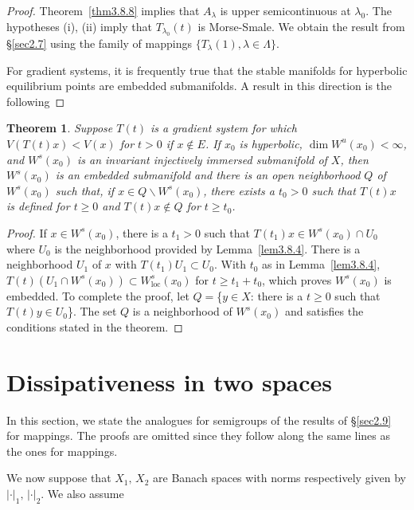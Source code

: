 \documentclass{surv-l}
\theoremstyle{plain}
\newtheorem{theorem}{Theorem}[section]
\theoremstyle{definition}
\numberwithin{equation}{section}
\numberwithin{figure}{chapter}
\begin{document}
\begin{proof} Theorem~\ref{thm3.8.8} implies that $A_{\lambda}$ is upper semicontinuous at $\lambda_{0}$. The hypotheses (i), (ii) imply that $T_{\lambda_{0}}(t)$ is Morse-Smale. We obtain the result from \S\ref{sec2.7} using the family of mappings $\{T_{\lambda}(1), \lambda\in\Lambda\}$.

For gradient systems, it is frequently true that the stable manifolds for hyperbolic equilibrium points are embedded submanifolds. A result in this direction is the following
\end{proof}

\begin{theorem}\label{thm3.8.11} Suppose $T(t)$ is a gradient system for which $V(T(t)x)< V(x)$ for $t>0$ if $x\not\in E$. If $x_{0}$ is hyperbolic, $\dim W^{u}(x_{0})<\infty$, and $W^{s}(x_{0})$ is an invariant injectively immersed submanifold of $X$, then $W^{s}(x_{0})$ is an embedded submanifold and there is an open neighborhood $Q$ of $W^{s}(x_{0})$ such that, if $ x\in Q\backslash W^{s}(x_{0})$, there exists a $t_{0}>0$ such that $T(t)x$ is defined for $t\geq 0$ and $ T(t)x\not\in Q$ for $t\geq t_{0}$.
\end{theorem}

\begin{proof} If $x\in W^{s}(x_{0})$, there is a $t_{1}>0$ such that $T(t_{1})x\in W^{s}(x_{0})\cap U_{0}$ where $U_{0}$ is the neighborhood provided by Lemma~\ref{lem3.8.4}. There is a neighborhood $U_{1}$ of $x$ with $T(t_{1})U_{1}\subset U_{0}$. With $t_{0}$ as in Lemma~\ref{lem3.8.4}, $ T(t)(U_{1}\cap W^{s}(x_{0}))\subset W_{\mathrm{loc}}^{s}(x_{0})$ for $t\geq t_{1}+t_{0}$, which proves $W^{s}(x_{0})$ is embedded. To complete the proof, let $Q=$\{$y\in X$: there is a $t\geq 0$ such that $T(t)y\in U_{0}$\}. The set $Q$ is a neighborhood of $W^{s}(x_{0})$ and satisfies the conditions stated in the theorem.
\end{proof}

\section{Dissipativeness in two spaces}\label{sec3.9}

In this section, we state the analogues for semigroups of the results of \S \ref{sec2.9} for mappings. The proofs are omitted since they follow along the same lines as the ones for mappings.

We now suppose that $X_{1},\, X_{2}$ are Banach spaces with norms respectively given by $|\cdot |_{1},\, |\cdot |_{2}$. We also assume
\end{document}
